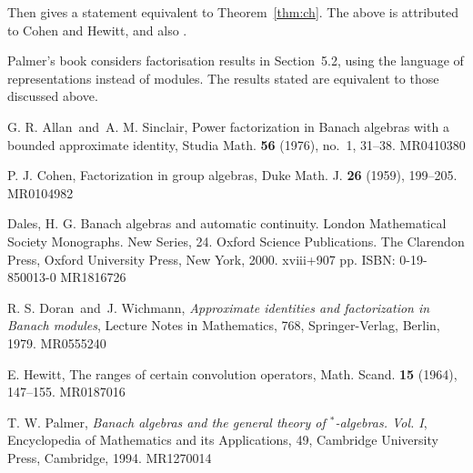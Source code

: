 \documentclass[a4paper,11pt]{article}
\theoremstyle{definition}
\begin{document}
Then \cite[Corollary~2.9.26]{dales} gives a statement equivalent to Theorem~\ref{thm:ch}.
The above is attributed to Cohen and Hewitt, and also \cite{as}.

Palmer's book \cite{palmer} considers factorisation results in Section~5.2, using the
language of representations instead of modules.  The results stated are equivalent to those
discussed above.

\begin{thebibliography}{99}

 G. R. Allan\ and\ A. M. Sinclair, Power factorization in Banach algebras with a bounded approximate identity, Studia Math. {\bf 56} (1976), no.~1, 31--38. MR0410380

 P. J. Cohen, Factorization in group algebras, Duke Math. J. {\bf 26} (1959), 199--205. MR0104982

 Dales, H. G. Banach algebras and automatic continuity. London Mathematical Society Monographs. New Series, 24. Oxford Science Publications. The Clarendon Press, Oxford University Press, New York, 2000. xviii+907 pp. ISBN: 0-19-850013-0 MR1816726

 R. S. Doran\ and\ J. Wichmann, {\it Approximate identities and factorization in Banach modules}, Lecture Notes in Mathematics, 768, Springer-Verlag, Berlin, 1979. MR0555240

 E. Hewitt, The ranges of certain convolution operators, Math. Scand. {\bf 15} (1964), 147--155. MR0187016

 T. W. Palmer, {\it Banach algebras and the general theory of $^*$-algebras. Vol. I}, Encyclopedia of Mathematics and its Applications, 49, Cambridge University Press, Cambridge, 1994. MR1270014

\end{thebibliography}
\end{document}
